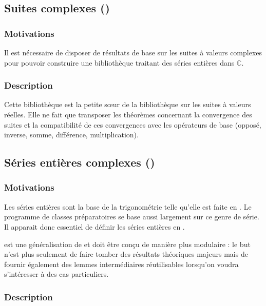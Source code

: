 \subsection{Suites complexes ()}

\subsubsection{Motivations}

Il est nécessaire de disposer de résultats de base sur les suites à valeurs complexes pour pouvoir construire une bibliothèque traitant des séries entières dans $\mathbb{C}$.

\subsubsection{Description}

Cette bibliothèque est la petite s\oe{}ur de la bibliothèque sur les suites à valeurs réelles. Elle ne fait que transposer les théorèmes concernant la convergence des suites et la compatibilité de ces convergences avec les opérateurs de base (opposé, inverse, somme, différence, multiplication).

\subsection{Séries entières complexes ()}

\subsubsection{Motivations}

Les séries entières sont la base de la trigonométrie telle qu'elle est faite en \coq{}. Le programme de classes préparatoires se base aussi largement sur ce genre de série. Il apparait donc essentiel de définir les séries entières en \coq{}.

 est une généralisation de  et doit être conçu de manière plus modulaire : le but n'est plus seulement de faire tomber des résultats théoriques majeurs mais de fournir également des lemmes intermédiaires réutilisables lorsqu'on voudra s'intéresser à des cas particuliers.

\subsubsection{Description}

